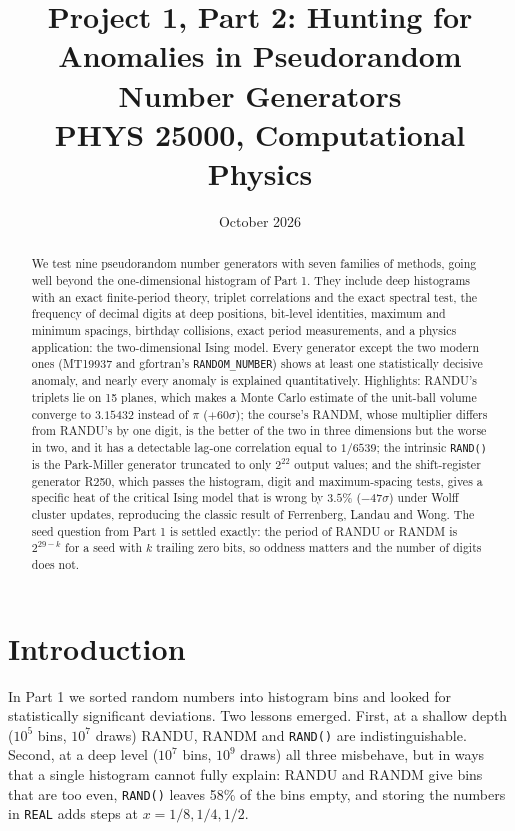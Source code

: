 \documentclass[11pt]{article}
\title{Project 1, Part 2: Hunting for Anomalies in Pseudorandom Number Generators\\[4pt]
\large PHYS 25000, Computational Physics}
\author{}
\date{October 2026}
\begin{document}
\maketitle

\begin{abstract}
We test nine pseudorandom number generators with seven families of methods, going well beyond the one-dimensional histogram of Part 1. They include deep histograms with an exact finite-period theory, triplet correlations and the exact spectral test, the frequency of decimal digits at deep positions, bit-level identities, maximum and minimum spacings, birthday collisions, exact period measurements, and a physics application: the two-dimensional Ising model. Every generator except the two modern ones (MT19937 and gfortran's \texttt{RANDOM\_NUMBER}) shows at least one statistically decisive anomaly, and nearly every anomaly is explained quantitatively. Highlights: RANDU's triplets lie on 15 planes, which makes a Monte Carlo estimate of the unit-ball volume converge to $3.15432$ instead of $\pi$ ($+60\sigma$); the course's RANDM, whose multiplier differs from RANDU's by one digit, is the better of the two in three dimensions but the worse in two, and it has a detectable lag-one correlation equal to $1/6539$; the intrinsic \texttt{RAND()} is the Park-Miller generator truncated to only $2^{22}$ output values; and the shift-register generator R250, which passes the histogram, digit and maximum-spacing tests, gives a specific heat of the critical Ising model that is wrong by $3.5\%$ ($-47\sigma$) under Wolff cluster updates, reproducing the classic result of Ferrenberg, Landau and Wong. The seed question from Part 1 is settled exactly: the period of RANDU or RANDM is $2^{29-k}$ for a seed with $k$ trailing zero bits, so oddness matters and the number of digits does not.
\end{abstract}

\section{Introduction}

In Part 1 we sorted random numbers into histogram bins and looked for statistically significant deviations. Two lessons emerged. First, at a shallow depth ($10^5$ bins, $10^7$ draws) RANDU, RANDM and \texttt{RAND()} are indistinguishable. Second, at a deep level ($10^7$ bins, $10^9$ draws) all three misbehave, but in ways that a single histogram cannot fully explain: RANDU and RANDM give bins that are too even, \texttt{RAND()} leaves 58\% of the bins empty, and storing the numbers in \texttt{REAL} adds steps at $x = 1/8, 1/4, 1/2$.
\end{document}
